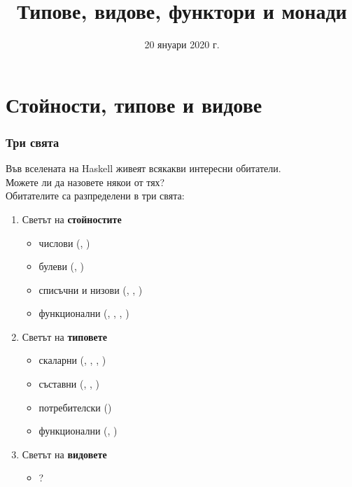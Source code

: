 \documentclass[alsotrans]{beamerswitch}
\title{Типове, видове, функтори и монади}
\date{20 януари 2020 г.}
\begin{document}
\begin{frame}
  \titlepage
\end{frame}

\section{Стойности, типове и видове}

\begin{frame}[fragile]
  \frametitle{Три свята}
  Във вселената на Haskell живеят всякакви интересни обитатели.\\
  Можете ли да назовете някои от тях?\pause\\[2ex]
  Обитателите са разпределени в три свята:\pause
  \begin{enumerate}[<+->]
    \small
  \item Светът на \textbf{стойностите}
    \begin{itemize}
    \item числови (, ) 
    \item булеви (, )
    \item списъчни и низови (\lst{[1, 2, 3]}, , \lst{[]})
    \item функционални (, \lst{(+)}, , )
    \end{itemize}
  \item Светът на \textbf{типовете}
    \begin{itemize}
    \item скаларни (, , , )
    \item съставни (\lst{[Int]}, , )
    \item потребителски ()
    \item функционални (, )
    \end{itemize}
  \item Светът на \textbf{видовете}
    \begin{itemize}
    \item \alert{?}
    \end{itemize}
  \end{enumerate}
\end{frame}
\end{document}
